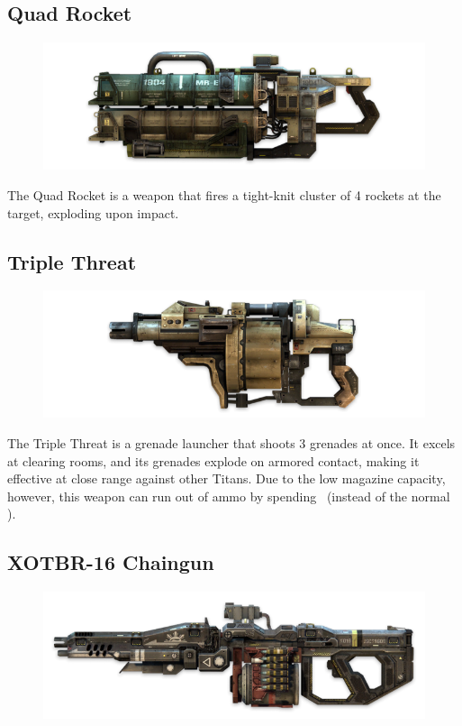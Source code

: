 \documentclass[9pt, openany]{extbook}
\begin{document}
\subsection{Quad Rocket}
\begin{figure}
\vspace*{-2em}
\includegraphics[width=\linewidth]{QuadRocket}
\end{figure}

The Quad Rocket is a weapon that fires a tight-knit cluster of 4 rockets at the target, exploding upon impact.

\subsection{Triple Threat}
\begin{figure}
\vspace*{-2em}
\includegraphics[width=\linewidth]{TripleThreat}
\end{figure}

The Triple Threat is a grenade launcher that shoots 3 grenades at once. It excels at clearing rooms, and its grenades explode on armored contact, making it effective at close range against other Titans. Due to the low magazine capacity, however, this weapon can run out of ammo by spending \Threat\Threat\Threat\ (instead of the normal \Despair).

\subsection{XOTBR-16 Chaingun}
\begin{figure}
\vspace*{-2em}
\includegraphics[width=\linewidth]{XO16Chaingun}
\end{figure}
\end{document}
